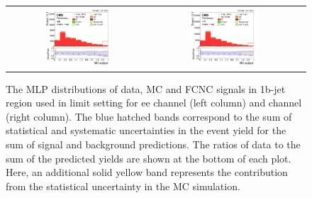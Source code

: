 \begin{figure}[ht]
  \begin{center}
    \begin{tabular}{ccc}
      \includegraphics[width=0.49\textwidth]{figures/tW/fig/FCNC_Result/ee/H_MLP_tug_xjet_1bjet.png} &
      \includegraphics[width=0.49\textwidth]{figures/tW/fig/FCNC_Result/mumu/H_MLP_tug_xjet_1bjet.png}\\
    \end{tabular}
    \caption{The MLP distributions of data, MC and FCNC signals in 1b-jet region used in limit setting for ee channel (left column) and \mumu channel (right column). The blue hatched bands correspond to the sum of statistical and systematic uncertainties in the event yield for the sum of signal and background predictions. The ratios of data to the sum of the predicted yields are shown at the bottom of each plot. Here, an additional solid yellow band represents the contribution from the statistical uncertainty in the MC simulation.
    \label{fig:limit_FCNC}}
  \end{center}
\end{figure}





